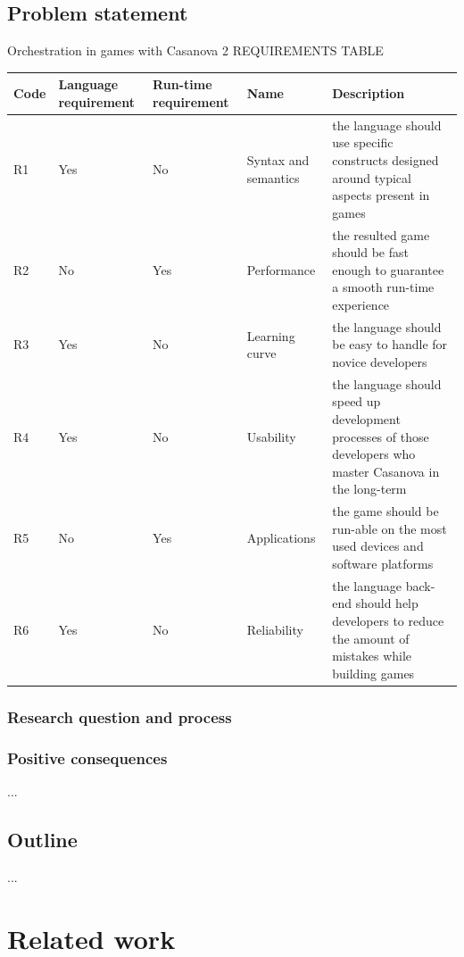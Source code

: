 \documentclass[10pt,a4paper]{book}
\begin{document}
\section{Problem statement}
Orchestration in games with Casanova 2
REQUIREMENTS TABLE 
\begin{center}
     \begin{tabular}{ | l | p{2cm} | p{2cm} | p{2cm}  | p{5cm} |}
     \hline
     Code & Language requirement & Run-time requirement & Name & Description \\ \hline
     R1 & Yes & No & Syntax and semantics & the language should use specific constructs designed around typical aspects present in games\\ \hline
     R2 & No & Yes & Performance & the resulted game should be fast enough to guarantee a smooth run-time experience\\ \hline
     R3 & Yes & No & Learning curve & the language should be easy to handle for novice developers \\ \hline
     R4 & Yes & No & Usability & the language should speed up development processes of those developers who master Casanova in the long-term\\ \hline
     R5 & No & Yes & Applications & the game should be run-able on the most used devices and software platforms\\ \hline
     R6 & Yes & No & Reliability & the language back-end should help developers to reduce the amount of mistakes while building games\\ \hline
     \end{tabular}
\end{center}

\subsection{Research question and process}


\subsection{Positive consequences}
...

\section{Outline}
...


\chapter{Related work}
\end{document}

